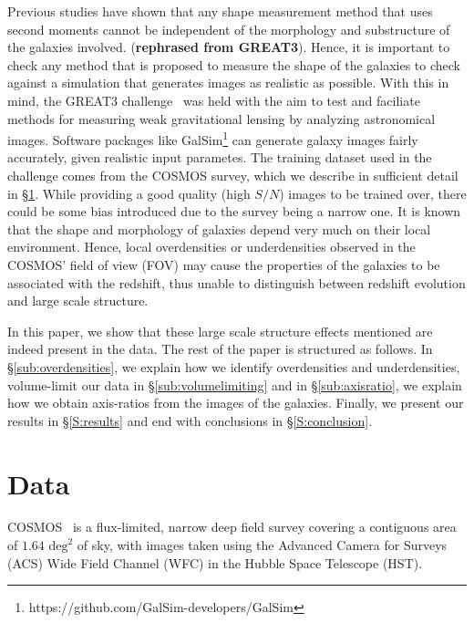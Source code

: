 \documentclass[twocolumn,useAMS,usenatbib]{mn2e}
\newcommand{\arun}[1]{}
\begin{document}
Previous studies have shown that any shape measurement method that uses second moments cannot be independent of the morphology and substructure of the galaxies involved. ({\bf rephrased from GREAT3}).
Hence, it is important to check any method that is proposed to measure the shape of the galaxies to check against a simulation that generates images as realistic as possible.  
With this in mind, the GREAT3 challenge~\citep{great3} was held with the aim to test and faciliate methods for measuring weak gravitational lensing by analyzing astronomical images.
Software packages like GalSim\footnote{https://github.com/GalSim-developers/GalSim} can generate galaxy images fairly accurately, given realistic input parametes.
The training dataset used in the challenge comes from the COSMOS survey, which we describe in sufficient detail in \S\ref{S:data}.
While providing a good quality (high $S/N$) images to be trained over, there could be some bias introduced due to the survey being a narrow one.
It is known \arun{cite refs.} that the shape and morphology of galaxies depend very much on their local environment. Hence, local overdensities or underdensities
observed in the COSMOS' field of view (FOV) may cause the properties of the galaxies to be associated with the redshift, thus unable to distinguish between redshift evolution and large scale structure.

In this paper, we show that these large scale structure effects mentioned are indeed present in the data. The rest of the paper is structured as follows.
In \S\ref{sub:overdensities}, we explain how we identify overdensities and underdensities, volume-limit our data in \S\ref{sub:volumelimiting} and in \S\ref{sub:axisratio},
 we explain how we obtain axis-ratios from the images of the galaxies. Finally, we present our results in \S\ref{S:results} and end with conclusions in \S\ref{S:conclusion}.
\section{Data}
\label{S:data}
COSMOS~\citep{COSMOS_overview, COSMOS_generic, COSMOS_Alexie} is a flux-limited, narrow deep field survey covering a contiguous area of $1.64 \text{ deg}^2$ of sky, with images taken using the Advanced Camera for Surveys (ACS) Wide Field Channel (WFC)
in the Hubble Space Telescope (HST). 
\end{document}
